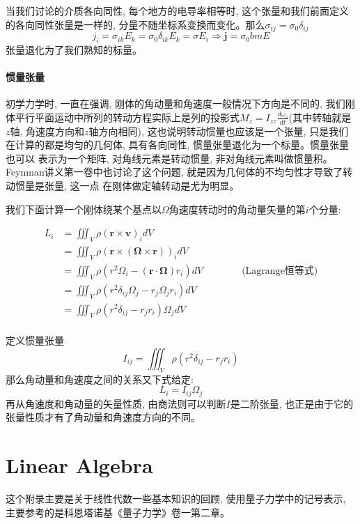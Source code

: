 当我们讨论的介质各向同性, 每个地方的电导率相等时, 这个张量和我们前面定义的各向同性张量是一样的, 分量不随坐标系变换而变化。那么$\sigma_{ij}=\sigma_0\delta_{ij}$
$$j_i=\sigma_{ik}E_k=\sigma_0\delta_{ik}E_k=\sigma E_i\Rightarrow\bm{j}=\sigma_0bm{E}$$张量退化为了我们熟知的标量。
\subsubsection*{惯量张量}
初学力学时, 一直在强调, 刚体的角动量和角速度一般情况下方向是不同的, 我们刚体平行平面运动中所列的转动方程实际上是列的投影式$M_z=I_{zz}\frac{d\omega_z}{dt}$(其中转轴就是
$z$轴, 角速度方向和$z$轴方向相同), 这也说明转动惯量也应该是一个张量, 只是我们在计算的都是均匀的几何体, 具有各向同性, 惯量张量退化为一个标量。惯量张量也可以
表示为一个矩阵, 对角线元素是转动惯量, 非对角线元素叫做惯量积。Feynman讲义第一卷中也讨论了这个问题, 就是因为几何体的不均匀性才导致了转动惯量是张量, 这一点
在刚体做定轴转动是尤为明显。

我们下面计算一个刚体绕某个基点以$\Omega$角速度转动时的角动量矢量的第$i$个分量:
\begin{center}
    \begin{equation*}
        \displaystyle
        \begin{split}
            L_i&=\iiint_V \rho(\bm{r}\times\bm{v})_idV\\
               &=\iiint_V \rho(\bm{r}\times\left(\bm{\Omega}\times\bm{r}\right))_idV\\
               &=\iiint_V \rho\left(r^2\Omega_i-\left(\bm{r}\cdot\bm{\Omega}\right)r_i\right)dV \qquad\qquad\text{(Lagrange恒等式)}\\
               &=\iiint_V \rho\left(r^2\delta_{ij}\Omega_j-r_j\Omega_jr_i\right)dV\\
               &=\iiint_V \rho\left(r^2\delta_{ij}-r_jr_i\right)\Omega_jdV\\
        \end{split}
    \end{equation*}
\end{center}    
定义惯量张量$$I_{ij}=\iiint_V \rho\left(r^2\delta_{ij}-r_jr_i\right)$$
那么角动量和角速度之间的关系又下式给定:
$$L_i=I_{ij}\Omega_j$$
再从角速度和角动量的矢量性质, 由商法则可以判断$I$是二阶张量, 也正是由于它的张量性质才有了角动量和角速度方向的不同。



\chapter{Linear Algebra}
\label{Appendix B}
这个附录主要是关于线性代数一些基本知识的回顾, 使用量子力学中的记号表示, 主要参考的是科恩塔诺基《量子力学》卷一第二章。
